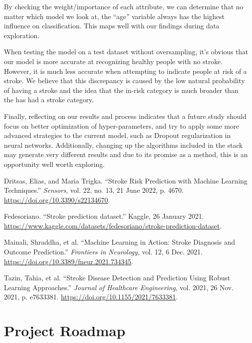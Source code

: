 \documentclass[11pt]{article}
\begin{document}
\medskip

By checking the weight/importance of each attribute, we can determine that no matter which model we look at, the “age” variable always has the highest influence on classification. This maps well with our findings during data exploration.

\medskip

When testing the model on a test dataset without oversampling, it’s obvious that our model is more accurate at recognizing healthy people with no stroke. However, it is much less accurate when attempting to indicate people at risk of a stroke.  We believe that this discrepancy is caused by the low natural probability of having a stroke and the idea that the in-risk category is much broader than the has had a stroke category.

\medskip

Finally, reflecting on our results and process indicates that a future study should focus on  better optimization of hyper-parameters, and try to apply some more advanced strategies to the current model, such as Dropout regularization in neural networks. Additionally, changing up the algorithms included in the stack may generate very different results and due to its promise as a method, this is an opportunity well worth exploring.

\newpage
\begin{thebibliography}{99}
Dritsas, Elias, and Maria Trigka. ``Stroke Risk Prediction with Machine Learning Techniques.'' \emph{Sensors}, vol. 22, no. 13, 21 June 2022, p. 4670. \url{https://doi.org/10.3390/s22134670}.

Fedesoriano. ``Stroke prediction dataset.'' Kaggle, 26 January 2021. \url{https://www.kaggle.com/datasets/fedesoriano/stroke-prediction-dataset}.

Mainali, Shraddha, et al. ``Machine Learning in Action: Stroke Diagnosis and Outcome Prediction.'' \emph{Frontiers in Neurology}, vol. 12, 6 Dec. 2021. \url{https://doi.org/10.3389/fneur.2021.734345}.

Tazin, Tahia, et al. ``Stroke Disease Detection and Prediction Using Robust Learning Approaches.'' \emph{Journal of Healthcare Engineering}, vol. 2021, 26 Nov. 2021, p. e7633381. \url{https://doi.org/10.1155/2021/7633381}.
\end{thebibliography}

\newpage
\section*{Project Roadmap}
\end{document}
